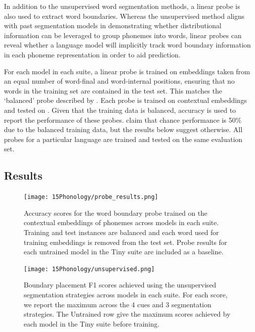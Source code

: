In addition to the unsupervised word segmentation methods, a linear probe is also used to extract word boundaries. Whereas the unsupervised method aligns with past segmentation models in demonstrating whether distributional information can be leveraged to group phonemes into words, linear probes can reveal whether a language model will implicitly track word boundary information in each phoneme representation in order to aid prediction. 

For each model in each suite, a linear probe is trained on embeddings taken from an equal number of word-final and word-internal positions, ensuring that no words in the training set are contained in the test set. This matches the `balanced' probe described by \citet{hahn-baroni-2019-tabula}. Each probe is trained on  contextual embeddings and tested on . Given that the training data is balanced, accuracy is used to report the performance of these probes. \citet{hahn-baroni-2019-tabula} claim that chance performance is 50\% due to the balanced training data, but the results below suggest otherwise. All probes for a particular language are trained and tested on the same evaluation set. 

\subsection{Results}

\begin{figure}[t]
    \centering
    \texttt{[image: 15Phonology/probe\_results.png]}
    \caption{Accuracy scores for the word boundary probe trained on the contextual embeddings of phonemes across models in each suite. Training and test instances are balanced and each word used for training embeddings is removed from the test set. Probe results for each untrained model in the Tiny suite are included as a baseline.}
    \label{fig:15-probes}
\end{figure}

\begin{figure}[t]
    \centering
    \texttt{[image: 15Phonology/unsupervised.png]}
    \caption{Boundary placement F1 scores achieved using the unsupervised segmentation strategies across models in each suite. For each score, we report the maximum across the 4 cues and 3 segmentation strategies. The Untrained row give the maximum scores achieved by each model in the Tiny suite before training.}
    \label{fig:15-unsupervised}
\end{figure}


